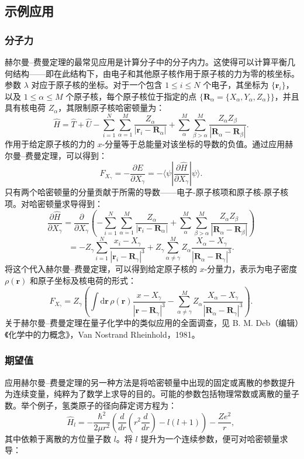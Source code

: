\subsection{示例应用}
\subsubsection{分子力}
赫尔曼–费曼定理的最常见应用是计算分子中的分子内力。这使得可以计算平衡几何结构——即在此结构下，由电子和其他原子核作用于原子核的力为零的核坐标。参数 \(\lambda\) 对应于原子核的坐标。对于一个包含 \(1 \leq i \leq N\) 个电子，其坐标为 \(\{\mathbf{r}_i\}\)，以及 \(1 \leq \alpha \leq M\) 个原子核，每个原子核位于指定的点 \(\{\mathbf{R}_{\alpha} = \{X_{\alpha}, Y_{\alpha}, Z_{\alpha}\}\}\)，并且具有核电荷 \(Z_{\alpha}\)，其限制原子核哈密顿量为：
\[
\hat{H} = \hat{T} + \hat{U} - \sum_{i=1}^{N} \sum_{\alpha=1}^{M} \frac{Z_{\alpha}}{|\mathbf{r}_i - \mathbf{R}_{\alpha}|} + \sum_{\alpha}^M \sum_{\beta > \alpha}^M \frac{Z_{\alpha} Z_{\beta}}{|\mathbf{R}_{\alpha} - \mathbf{R}_{\beta}|}.~
\]
作用于给定原子核的力的 \(x\)-分量等于总能量对该坐标的导数的负值。通过应用赫尔曼–费曼定理，可以得到：
\[
F_{X_{\gamma}} = -\frac{\partial E}{\partial X_{\gamma}} = -\langle \psi | \frac{\partial \hat{H}}{\partial X_{\gamma}} | \psi \rangle.~
\]
只有两个哈密顿量的分量贡献于所需的导数——电子-原子核项和原子核-原子核项。对哈密顿量求导得到：
\[
\frac{\partial \hat{H}}{\partial X_{\gamma}} = \frac{\partial}{\partial X_{\gamma}} \left( - \sum_{i=1}^{N} \sum_{\alpha=1}^{M} \frac{Z_{\alpha}}{|\mathbf{r}_i - \mathbf{R}_{\alpha}|} + \sum_{\alpha}^M \sum_{\beta > \alpha}^M \frac{Z_{\alpha} Z_{\beta}}{|\mathbf{R}_{\alpha} - \mathbf{R}_{\beta}|} \right)~
\]
\[
= -Z_{\gamma} \sum_{i=1}^{N} \frac{x_i - X_{\gamma}}{|\mathbf{r}_i - \mathbf{R}_{\gamma}|^3} + Z_{\gamma} \sum_{\alpha \neq \gamma}^M Z_{\alpha} \frac{X_{\alpha} - X_{\gamma}}{|\mathbf{R}_{\alpha} - \mathbf{R}_{\gamma}|^3}.~
\]
将这个代入赫尔曼–费曼定理，可以得到给定原子核的 \(x\)-分量力，表示为电子密度 \(\rho(\mathbf{r})\) 和原子坐标及核电荷的形式：
\[
F_{X_{\gamma}} = Z_{\gamma} \left( \int \mathrm{d} \mathbf{r} \, \rho(\mathbf{r}) \frac{x - X_{\gamma}}{|\mathbf{r} - \mathbf{R}_{\gamma}|^3} - \sum_{\alpha \neq \gamma}^M Z_{\alpha} \frac{X_{\alpha} - X_{\gamma}}{|\mathbf{R}_{\alpha} - \mathbf{R}_{\gamma}|^3} \right).~
\]
关于赫尔曼–费曼定理在量子化学中的类似应用的全面调查，见 B. M. Deb（编辑）《化学中的力概念》，Van Nostrand Rheinhold，1981。
\subsubsection{期望值}
应用赫尔曼–费曼定理的另一种方法是将哈密顿量中出现的固定或离散的参数提升为连续变量，纯粹为了数学上求导的目的。可能的参数包括物理常数或离散的量子数。举个例子，氢类原子的径向薛定谔方程为：
\[
\hat{H}_l = - \frac{\hbar^2}{2\mu r^2} \left( \frac{d}{dr} \left( r^2 \frac{d}{dr} \right) - l(l+1) \right) - \frac{Ze^2}{r},~
\]
其中依赖于离散的方位量子数 \(l\)。将 \(l\) 提升为一个连续参数，便可对哈密顿量求导：

